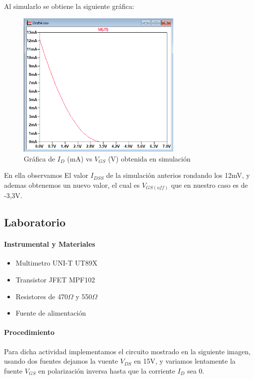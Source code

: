 Al simularlo se obtiene la siguiente gráfica:
\begin{figure}[ht]
    \centering
    \includegraphics[width=8cm]{./imagenes/Sim2.png}
    \caption{Gráfica de $I_D$ (mA) vs $V_{GS}$ (V) obtenida en simulación}
    \label{fig:sim2}
\end{figure}

En ella observamos El valor $I_{DSS}$ de la simulación anterios rondando los 12mV, y ademas obtenemos un nuevo valor, el cual es $V_{GS(off)}$ que en nuestro caso es de -3,3V.

\subsection{Laboratorio}

\paragraph{Instrumental y Materiales}
\begin{itemize}
    \item Multimetro UNI-T UT89X
    \item Transistor JFET MPF102
    \item Resistores de 470$\Omega$ y 550$\Omega$
    \item Fuente de alimentación
\end{itemize}

\paragraph{Procedimiento}

Para dicha actividad implementamos el circuito mostrado en la siguiente imagen, usando dos fuentes dejamos la vuente $V_{DS}$ en 15V, y variamos lentamente la fuente $V_{GS}$ en polarización inversa hasta que la corriente $I_D$ sea 0.

